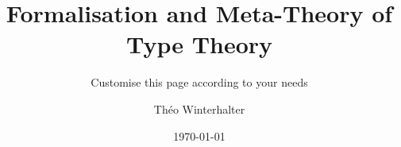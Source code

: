 \documentclass[
  fontsize=10pt,
  twoside=false
]{kaobook}
\begin{document}
\makeatletter
\def\pgfsys@hboxsynced#1{%
  {%
    \pgfsys@beginscope%
    \setbox\pgf@hbox=\hbox{%
      \hskip\pgf@pt@x%
      \raise\pgf@pt@y\hbox{%
        \pgf@pt@x=0pt%
        \pgf@pt@y=0pt%
        \special{pdf: content q}%
        \pgflowlevelsynccm%
        \pgfsys@invoke{q -1 0 0 -1 0 0 cm}%
        \special{pdf: content -1 0 0 -1 0 0 cm q}%
        \pgfsys@invoke{0 J [] 0 d}%
        \wd#1=0pt%
        \ht#1=0pt%
        \dp#1=0pt%
        \box#1%
        \pgfsys@invoke{n Q Q Q}%
      }%
      \hss%
    }%
    \wd\pgf@hbox=0pt%
    \ht\pgf@hbox=0pt%
    \dp\pgf@hbox=0pt%
    \pgfsys@hbox\pgf@hbox%
    \pgfsys@endscope%
  }%
}
\makeatother

\setmainfont[
	Ligatures=TeX,
	ItalicFont = Fira Sans Light Italic,
	BoldFont = Fira Sans,
	BoldItalicFont = Fira Sans Italic
]{Fira Sans Light}
\setmonofont[Ligatures=TeX]{Fira Mono}


\titlehead{Some text}
\subject{PhD Thesis}

\title{Formalisation and Meta-Theory of Type Theory}
\subtitle{Customise this page according to your needs}

\author{Théo Winterhalter}

\date{\today}

\publishers{An Awesome Publisher}


\frontmatter %


\end{document}
